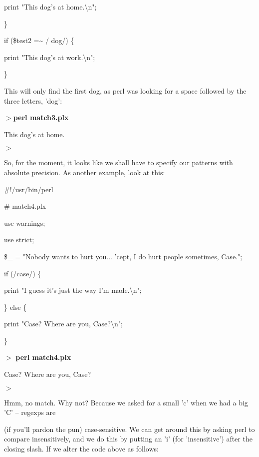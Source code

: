 \documentclass[a4paper,11pt]{book}
\begin{document}
\noindent print "This dog's at home.\textbackslash n";

\noindent \}

\noindent 

\noindent if (\$test2 =\~{} / dog/) \{

\noindent print "This dog's at work.\textbackslash n";

\noindent \}

\noindent 

\noindent This will only find the first dog, as perl was looking for a space followed by the three letters, 'dog':

\noindent 

\noindent $>$\textbf{perl match3.plx}

\noindent This dog's at home.

\noindent $>$

\noindent 

\noindent So, for the moment, it looks like we shall have to specify our patterns with absolute precision. As another example, look at this:

\noindent 

\noindent \#!/usr/bin/perl

\noindent \# match4.plx

\noindent use warnings;

\noindent use strict;

\noindent 

\noindent 

\noindent \$\_  = "Nobody wants to hurt you... 'cept, I do hurt people sometimes, Case.";

\noindent if (/case/) \{

\noindent print "I guess it's just the way I'm made.\textbackslash n";

\noindent \} else \{

\noindent print "Case? Where are you, Case?\textbackslash n";

\noindent \}

\noindent 

\noindent $>$ \textbf{perl match4.plx}

\noindent Case? Where are you, Case?

\noindent $>$

\noindent 

\noindent Hmm,  no  match.  Why not?  Because  we asked  for  a  small  'c'  when we  had a  big 'C'  --  regexps  are

\noindent (if you'll  pardon the  pun)  case-sensitive.  We can  get  around  this  by  asking  perl  to  compare insensitively,  and we do  this  by  putting  an  'i'  (for  'insensitive')  after  the closing  slash.  If  we  alter the code above as follows:
\end{document}
